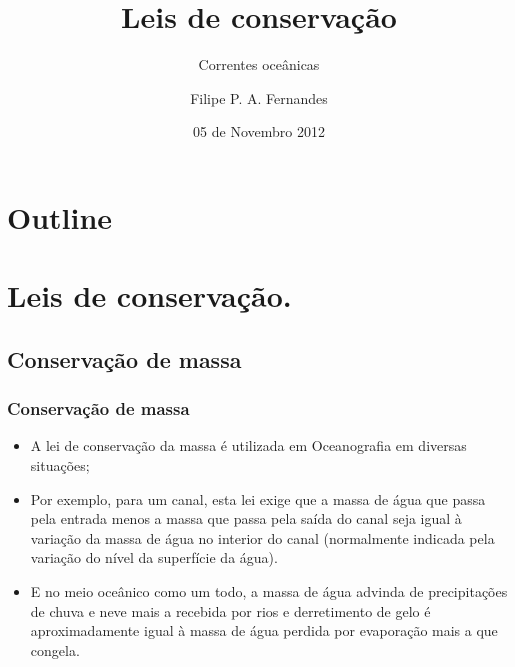 \title[Aula 09]{Leis de conservação}
\subtitle{Correntes oceânicas}
\author[Filipe Fernandes]{Filipe P. A. Fernandes}
\date[Novembro 2012]{05 de Novembro 2012}




\begin{frame}[plain]
  \titlepage
\end{frame}

\section*{Outline}
\begin{frame}
\tableofcontents
\end{frame}

\section{Leis de conservação.}

\subsection{Conservação de massa}
\begin{frame}
\frametitle{Conservação de massa}
{\small
  \begin{itemize}[<+-| alert@+>]
    \item A lei de conservação da massa é utilizada em Oceanografia em diversas
          situações;
    \item Por exemplo, para um canal, esta lei exige que a massa de água que
          passa pela entrada menos a massa que passa pela saída do canal seja
          igual à variação da massa de água no interior do canal (normalmente
          indicada pela variação do nível da superfície da água).
    \item E no meio oceânico como um todo, a massa de água advinda de
          precipitações de chuva e neve mais a recebida por rios e derretimento
          de gelo é aproximadamente igual à massa de água perdida por
          evaporação mais a que congela.
  \end{itemize}
}
\end{frame}

